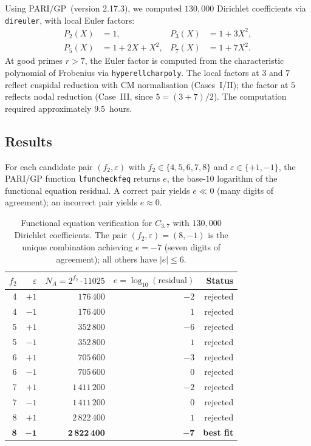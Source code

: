 \documentclass[11pt,a4paper]{article}
\theoremstyle{definition}
\theoremstyle{remark}
\begin{document}
Using PARI/GP~(version 2.17.3), we computed $130{,}000$ Dirichlet
coefficients via \texttt{direuler}, with local Euler factors:
\begin{align*}
  P_2(X) &= 1, &
  P_3(X) &= 1 + 3X^2, \\
  P_5(X) &= 1 + 2X + X^2, &
  P_7(X) &= 1 + 7X^2.
\end{align*}
At good primes $r > 7$, the Euler factor is computed from the
characteristic polynomial of Frobenius via
\texttt{hyperellcharpoly}.
The local factors at $3$ and $7$ reflect cuspidal reduction with
CM normalisation (Cases~I/II); the factor at $5$ reflects nodal
reduction (Case~III, since $5 = (3+7)/2$).
The computation required approximately $9.5$~hours.

\subsection{Results}

For each candidate pair $(f_2, \varepsilon)$ with
$f_2 \in \{4, 5, 6, 7, 8\}$ and $\varepsilon \in \{+1, -1\}$,
the PARI/GP function \texttt{lfuncheckfeq} returns $e$, the
base-$10$ logarithm of the functional equation residual.
A correct pair yields $e \ll 0$ (many digits of agreement);
an incorrect pair yields $e \approx 0$.

\begin{table}[H]
\centering
\begin{tabular}{rrrrr}
\toprule
$f_2$ & $\varepsilon$ & $N_A = 2^{f_2}\cdot 11025$ & $e = \log_{10}(\text{residual})$ & Status \\
\midrule
4 & $+1$ & $176\,400$ & $-2$ & rejected \\
4 & $-1$ & $176\,400$ & $\phantom{-}1$ & rejected \\
5 & $+1$ & $352\,800$ & $-6$ & rejected \\
5 & $-1$ & $352\,800$ & $\phantom{-}1$ & rejected \\
6 & $+1$ & $705\,600$ & $-3$ & rejected \\
6 & $-1$ & $705\,600$ & $\phantom{-}0$ & rejected \\
7 & $+1$ & $1\,411\,200$ & $-2$ & rejected \\
7 & $-1$ & $1\,411\,200$ & $\phantom{-}0$ & rejected \\
8 & $+1$ & $2\,822\,400$ & $\phantom{-}1$ & rejected \\
\textbf{8} & $\boldsymbol{-1}$ & $\boldsymbol{2\,822\,400}$ & $\boldsymbol{-7}$ & \textbf{best fit} \\
\bottomrule
\end{tabular}
\caption{Functional equation verification for $C_{3,7}$
  with $130{,}000$ Dirichlet coefficients.
  The pair $(f_2, \varepsilon) = (8, -1)$ is the unique combination
  achieving $e = -7$ (seven digits of agreement);
  all others have $|e| \le 6$.}
\label{tab:feq}
\end{table}
\end{document}
